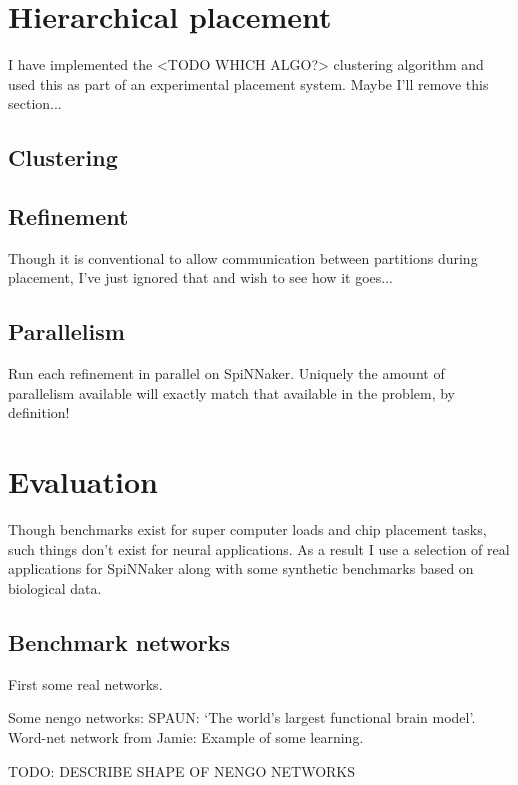 	\section{Hierarchical placement}
		
		I have implemented the <TODO WHICH ALGO?> clustering algorithm and used
		this as part of an experimental placement system. Maybe I'll remove this
		section...
		
		\subsection{Clustering}
		
		\subsection{Refinement}
			
			Though it is conventional to allow communication between partitions
			during placement, I've just ignored that and wish to see how it goes...
		
		\subsection{Parallelism}
			
			Run each refinement in parallel on SpiNNaker. Uniquely the amount of
			parallelism available will exactly match that available in the problem,
			by definition!
	
	\section{Evaluation}
		
		Though benchmarks exist for super computer loads and chip placement tasks,
		such things don't exist for neural applications. As a result I use a
		selection of real applications for SpiNNaker along with some synthetic
		benchmarks based on biological data.
		
		\subsection{Benchmark networks}
			
			First some real networks.
			
			Some nengo networks: SPAUN: `The world's largest functional brain model'.
			Word-net network from Jamie: Example of some learning.
			
			TODO: DESCRIBE SHAPE OF NENGO NETWORKS
			
